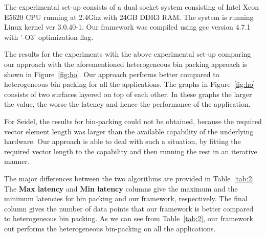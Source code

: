 The experimental set-up consists of a dual socket system consisting of
Intel Xeon E5620 CPU running at 2.4Ghz with 24GB DDR3 RAM. The system
is running Linux kernel ver 3.0.40-1. Our framework was compiled
using gcc version 4.7.1 with '-O3' optimization flag.

The results for the experiments with the above experimental set-up
comparing our approach with the aforementioned heterogeneous bin packing
approach is shown in Figure~\ref{fig:ho}. Our approach performs better
compared to heterogeneous bin packing for all the applications. The
graphs in Figure~\ref{fig:ho} consists of two surfaces layered on top of
each other. In these graphs the larger the value, the worse the latency
and hence the performance of the application. %

For Seidel, the results for bin-packing could not be obtained, because
the required vector element length was larger than the available
capability of the underlying hardware. Our approach is able to deal with
such a situation, by fitting the required vector length to the
capability and then running the rest in an iterative manner.

The major differences between the two algorithms are provided in
Table~\ref{tab:2}. The \textbf{Max latency} and \textbf{Min latency}
columns give the maximum and the minimum latencies for bin packing and
our framework, respectively. The final column gives the number of data
points that our framework is better compared to heterogeneous bin
packing. As we can see from Table~\ref{tab:2}, our framework out
performs the heterogeneous bin-packing on all the applications.

